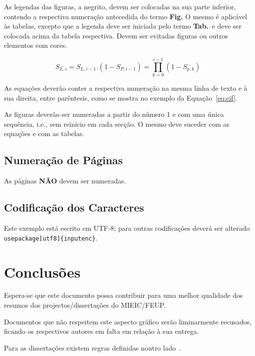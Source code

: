 \documentclass[9pt,a4paper]{extarticle}
\begin{document}
\begin{multicols}{2}
As legendas das figuras, a negrito, devem ser colocadas na sua parte inferior, contendo a respectiva numeração antecedida do termo \textbf{Fig.} 
O mesmo é aplicável às tabelas, excepto que a legenda deve ser iniciada pelo termo \textbf{Tab.}\ e deve ser colocada acima da tabela respectiva. 
Devem ser evitadas figuras ou outros elementos com cores.

\begin{equation}
  S_{L,i} = S_{L,i-1} . (1-S_{P,i-1}) = \prod_{k=0}^{i-1} (1-S_{p,k}) \label{eq:cif}
\end{equation}

As equações deverão conter a respectiva numeração na mesma linha de texto e à sua direita, entre parêntesis, como se mostra no exemplo da Equação~\ref{eq:cif}.

As figuras deverão ser numeradas a partir do número 1 e com uma única sequência, i.e., sem reinício em cada secção. 
O mesmo deve suceder com as equações e com as tabelas.

\subsection{Numeração de Páginas}\label{sec:number}

As páginas \textbf{NÃO} devem ser numeradas.

\subsection{Codificação dos Caracteres}\label{sec:encomding}

Este exemplo está escrito em UTF-8; para outras codificações deverá
ser alterado \texttt{\\usepackage[utf8]\{inputenc\}}.


\section{Conclusões}\label{sec:conclui}

Espera-se que este documento possa contribuir para uma melhor qualidade dos resumos dos projectos/dissertações do MIEIC/FEUP.

Documentos que não respeitem este aspecto gráfico serão liminarmente recusados, ficando os respectivos autores em falta em relação à sua entrega.

Para as dissertações existem regras definidas noutro lado~\cite{kn:Mat93}.



\end{multicols}
\end{document}

